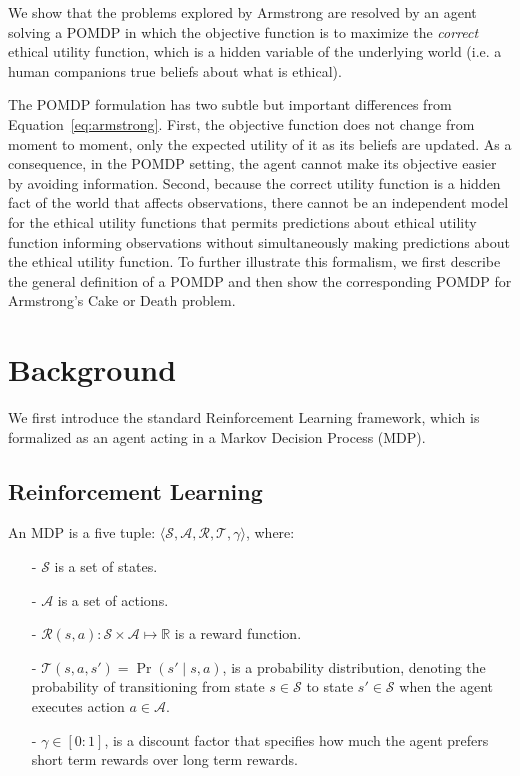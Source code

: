 \documentclass[11pt]{article}
\begin{document}
We show that the problems explored by Armstrong are resolved by an agent solving a POMDP in which the objective function is to maximize the {\em correct} ethical utility function, which is a hidden variable of the underlying world (i.e. a human companions true beliefs about what is ethical).

The POMDP formulation has two subtle but important differences from Equation~\ref{eq:armstrong}. First, the objective function does not change from moment to moment, only the expected utility of it as its beliefs are updated. As a consequence, in the POMDP setting, the agent cannot make its objective easier by avoiding information. Second, because the correct utility function is a hidden fact of the world that affects observations, there cannot be an independent model for the ethical utility functions that permits predictions about ethical utility function informing observations without simultaneously making predictions about the ethical utility function. To further illustrate this formalism, we first describe the general definition of a POMDP and then show the corresponding POMDP for Armstrong's Cake or Death problem.


\section{Background}

We first introduce the standard Reinforcement Learning framework, which is formalized as an agent acting in a Markov Decision Process (MDP).

\subsection{Reinforcement Learning}

An MDP is a five tuple: $\langle \mathcal{S}, \mathcal{A}, \mathcal{R}, \mathcal{T}, \gamma \rangle$, where:
\begin{itemize}
\item[-] $\mathcal{S}$ is a set of states.
\item[-] $\mathcal{A}$ is a set of actions.
\item[-] $\mathcal{R}(s,a) : \mathcal{S} \times \mathcal{A} \mapsto \mathbb{R}$ is a reward function.
\item[-] $\mathcal{T}(s,a,s') = \Pr(s' \mid s, a)$, is a probability distribution, denoting the probability of transitioning from state $s \in \mathcal{S}$ to state $s' \in \mathcal{S}$ when the agent executes action $a \in \mathcal{A}$.
\item[-] $\gamma \in [0:1]$, is a discount factor that specifies how much the agent prefers short term rewards over long term rewards.
\end{itemize}
\end{document}
